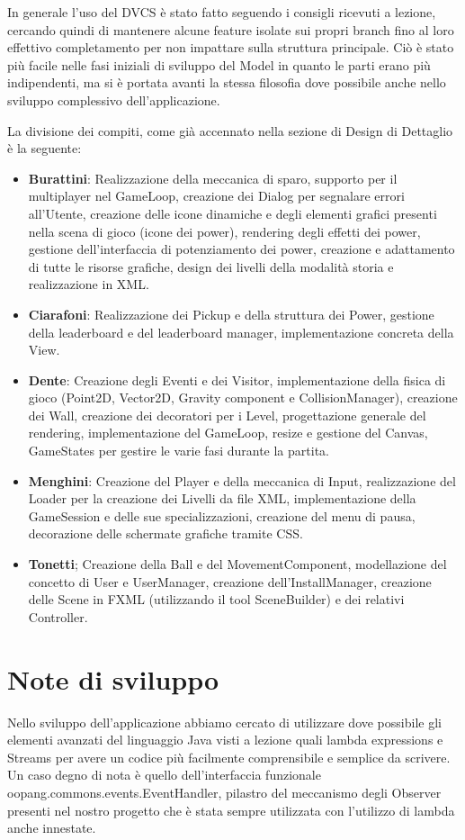 \documentclass[a4paper,12pt]{report}
\begin{document}
In generale l'uso del DVCS è stato fatto seguendo i consigli ricevuti a lezione, cercando quindi di mantenere alcune feature isolate sui propri branch fino al loro effettivo completamento per non impattare sulla struttura principale.
Ciò è stato più facile nelle fasi iniziali di sviluppo del Model in quanto le parti erano più indipendenti, ma si è portata avanti la stessa filosofia dove possibile anche nello sviluppo complessivo dell'applicazione.

La divisione dei compiti, come già accennato nella sezione di Design di Dettaglio è la seguente:
\begin{itemize}
	\item \textbf{Burattini}: Realizzazione della meccanica di sparo, supporto per il multiplayer nel GameLoop, creazione dei Dialog per segnalare errori all'Utente, creazione delle icone dinamiche e degli elementi grafici presenti nella scena di gioco (icone dei power), rendering degli effetti dei power, gestione dell'interfaccia di potenziamento dei power, creazione e adattamento di tutte le risorse grafiche, design dei livelli della modalità storia e realizzazione in XML.
	\item \textbf{Ciarafoni}: Realizzazione dei Pickup e della struttura dei Power, gestione della leaderboard e del leaderboard manager, implementazione concreta della View.
	\item \textbf{Dente}: Creazione degli Eventi e dei Visitor, implementazione della fisica di gioco (Point2D, Vector2D, Gravity component e CollisionManager), creazione dei Wall, creazione dei decoratori per i Level, progettazione generale del rendering, implementazione del GameLoop, resize e gestione del Canvas, GameStates per gestire le varie fasi durante la partita.
	\item \textbf{Menghini}: Creazione del Player e della meccanica di Input, realizzazione del Loader per la creazione dei Livelli da file XML, implementazione della GameSession e delle sue specializzazioni, creazione del menu di pausa, decorazione delle schermate grafiche tramite CSS.
	\item \textbf{Tonetti}; Creazione della Ball e del MovementComponent, modellazione del concetto di User e UserManager, creazione dell'InstallManager, creazione delle Scene in FXML (utilizzando il tool SceneBuilder) e dei relativi Controller.
\end{itemize}

\section{Note di sviluppo}
Nello sviluppo dell'applicazione abbiamo cercato di utilizzare dove possibile gli elementi avanzati del linguaggio Java visti a lezione quali lambda expressions e Streams per avere un codice più facilmente comprensibile e semplice da scrivere.
Un caso degno di nota è quello dell'interfaccia funzionale oopang.commons.events.EventHandler, pilastro del meccanismo degli Observer presenti nel nostro progetto che è stata sempre utilizzata con l'utilizzo di lambda anche innestate.
\end{document}

